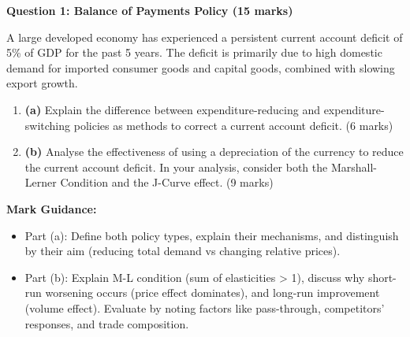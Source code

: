 \documentclass[11pt, a4paper, twoside]{book}
\begin{document}
\begin{exampractice}

\textbf{Question 1: Balance of Payments Policy (15 marks)}

A large developed economy has experienced a persistent current account deficit of 5\% of GDP for the past 5 years. The deficit is primarily due to high domestic demand for imported consumer goods and capital goods, combined with slowing export growth.

\begin{enumerate}
  \item \textbf{(a)} Explain the difference between expenditure-reducing and expenditure-switching policies as methods to correct a current account deficit. (6 marks)

  \item \textbf{(b)} Analyse the effectiveness of using a depreciation of the currency to reduce the current account deficit. In your analysis, consider both the Marshall-Lerner Condition and the J-Curve effect. (9 marks)
\end{enumerate}

\textbf{Mark Guidance:}
\begin{itemize}
  \item Part (a): Define both policy types, explain their mechanisms, and distinguish by their aim (reducing total demand vs changing relative prices).
  \item Part (b): Explain M-L condition (sum of elasticities > 1), discuss why short-run worsening occurs (price effect dominates), and long-run improvement (volume effect). Evaluate by noting factors like pass-through, competitors' responses, and trade composition.
\end{itemize}

\end{exampractice}
\end{document}
